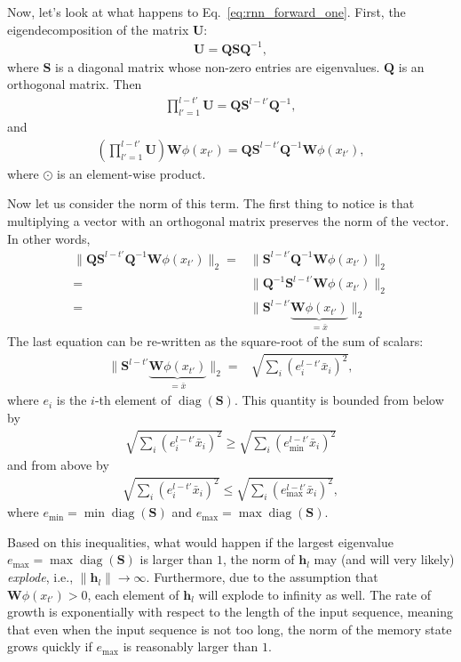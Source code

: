 \documentclass{report}
\newcommand{\vect}[1]{\mathbf{#1}}
\newcommand{\matr}[1]{\mathbf{#1}}
\newcommand{\diag}[0]{\operatorname{diag}}
\newcommand{\vh}[0]{\vect{h}}
\newcommand{\mW}[0]{\matr{W}}
\newcommand{\mQ}[0]{\matr{Q}}
\newcommand{\mU}[0]{\matr{U}}
\newcommand{\mS}{\matr{S}}
\begin{document}
Now, let's look at what happens to Eq.~\eqref{eq:rnn_forward_one}. First, the
eigendecomposition of the matrix $\mU$:
\begin{align*}
    \mU = \mQ \mS \mQ^{-1},
\end{align*}
where $\mS$ is a diagonal matrix whose non-zero entries are eigenvalues.
$\mQ$ is an orthogonal matrix. Then
\begin{align*}
    \prod_{l'=1}^{l-t'} \mU = \mQ \mS^{l-t'} \mQ^{-1},
\end{align*}
and
\begin{align*}
    \left(\prod_{l'=1}^{l-t'} \mU\right) \mW\phi(x_{t'})
    = \mQ \mS^{l-t'} \mQ^{-1} \mW\phi(x_{t'}),
\end{align*}
where $\odot$ is an element-wise product.

Now let us consider the norm of this term. The first thing to notice is that
multiplying a vector with an orthogonal matrix preserves the norm of the vector.
In other words,
\begin{align*}
    \|\mQ \mS^{l-t'} \mQ^{-1} \mW\phi(x_{t'})\|_2 
    =& \|\mS^{l-t'} \mQ^{-1} \mW\phi(x_{t'})\|_2 
    \\
    =& \|\mQ^{-1} \mS^{l-t'} \mW\phi(x_{t'})\|_2 
    \\
    =& \|\mS^{l-t'} \underbrace{\mW\phi(x_{t'})}_{=\bar{x}} \|_2 
\end{align*}
The last equation can be re-written as the square-root of the sum of scalars:
\begin{align*}
    \|\mS^{l-t'} \underbrace{\mW\phi(x_{t'})}_{=\bar{x}} \|_2  
    =& \sqrt{\sum_{i} (e_i^{l-t'} \bar{x}_i)^2},
\end{align*}
where $e_i$ is the $i$-th element of $\diag(\mS)$. 
This quantity is bounded from below by
\begin{align*}
    \sqrt{\sum_{i} (e_i^{l-t'} \bar{x}_i)^2} \geq \sqrt{\sum_{i} (e_{\min}^{l-t'} \bar{x}_i)^2} 
\end{align*}
and from above by
\begin{align*}
    \sqrt{\sum_{i} (e_i^{l-t'} \bar{x}_i)^2} \leq \sqrt{\sum_{i}
    (e_{\max}^{l-t'} \bar{x}_i)^2},
\end{align*}
where $e_{\min} = \min \diag(\mS)$ and $e_{\max} = \max \diag(\mS)$.

Based on this inequalities, what would happen if the largest eigenvalue
$e_{\max} = \max \diag(\mS)$ is larger than $1$, the norm of $\vh_l$ may (and
will very likely) {\em explode}, i.e., $\|\vh_l\| \to \infty$.  Furthermore, due
to the assumption that $\mW\phi(x_{t'}) > 0$, each element of $\vh_l$ will
explode to infinity as well.  The rate of growth is exponentially with respect
to  the length of the input sequence, meaning that even when the input sequence
is not too long, the norm of the memory state grows quickly if $e_{\max}$ is
reasonably larger than $1$. 
\end{document}
